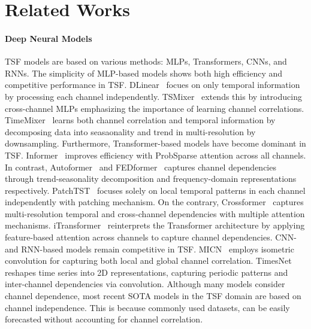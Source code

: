 \section{Related Works}
\label{sec:Related_Works}

\paragraph{\textbf{Deep Neural Models}}
TSF models are based on various methods: MLPs, Transformers, CNNs, and RNNs.
The simplicity of MLP-based models shows both high efficiency and competitive performance in TSF. DLinear~\cite{zeng22Dlinear} focues on only temporal information by processing each channel independently. 
TSMixer~\cite{chen23TSMixer} extends this by introducing cross-channel MLPs emphasizing the importance of learning channel correlations.
TimeMixer~\cite{wang24TM} learns both channel correlation and temporal information by decomposing data into seasaonality and trend in multi-resolution by downsampling.
Furthermore, Transformer-based models have become dominant in TSF. Informer~\cite{informer} improves efficiency with ProbSparse attention across all channels. 
In contrast, Autoformer~\cite{autoformer} and FEDformer~\cite{fedformer} captures channel dependencies through trend-seasonality decomposition and frequency-domain representations respectively.
PatchTST~\cite{nie23} focuses solely on local temporal patterns in each channel independently with patching mechanism. 
On the contrary, Crossformer~\cite{zhang23} captures multi-resolution temporal and cross-channel dependencies with multiple attention mechanisms.
iTransformer~\cite{liu24} reinterprets the Transformer architecture by applying feature-based attention across channels to capture channel dependencies.
CNN- and RNN-based models remain competitive in TSF.
MICN~\cite{MICN} employs isometric convolution for capturing both local and global channel correlation.
TimesNet~\cite{timesnet} reshapes time series into 2D representations, capturing periodic patterns and inter-channel dependencies via convolution.
Although many models consider channel dependence, most recent SOTA models in the TSF domain are based on channel independence.
This is because commonly used datasets, can be easily forecasted without accounting for channel correlation.

